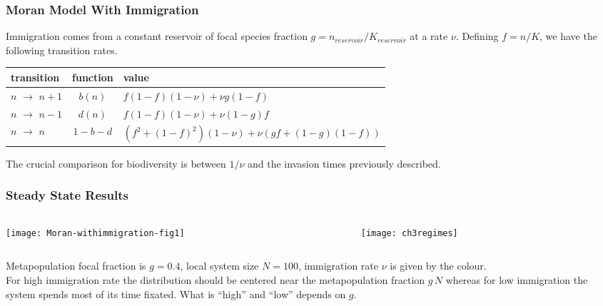 \documentclass[dvipsnames]{beamer}
\begin{document}
\begin{frame}
\frametitle{Moran Model With Immigration}
Immigration comes from a constant reservoir of focal species fraction $g=n_{reservoir}/K_{reservoir}$ at a rate $\nu$. 
Defining $f=n/K$, we have the following transition rates. 
\footnotesize{
\begin{center}
	\begin{tabular}{l|c|l}
		transition		& function	& value \\
		\hline
		$n$ $\rightarrow$ $n+1$	& $b(n)$	& $f(1-f)(1-\nu) + \nu g(1-f)$ \\
		$n$ $\rightarrow$ $n-1$	& $d(n)$	& $f(1-f)(1-\nu) + \nu (1-g)f$ \\
		$n$ $\rightarrow$ $n$	& $1-b-d$	& $\left(f^2+(1-f)^2\right)(1-\nu) + \nu\left(gf+(1-g)(1-f)\right)$
	\end{tabular}
\end{center}
}\normalsize{}
\pause
The crucial comparison for biodiversity is between $1/\nu$ and the invasion times previously described. 
\end{frame}


\begin{frame}
\frametitle{Steady State Results}
\begin{columns}
	\begin{column}{6cm}
		\begin{center}
			\texttt{[image: Moran-withimmigration-fig1]}
		\end{center}
	\end{column}
	\begin{column}{5cm}
		\begin{center}
			\texttt{[image: ch3regimes]}
		\end{center}
	\end{column}
\end{columns}
\justifying
\footnotesize{
Metapopulation focal fraction is $g=0.4$, local system size $N=100$, immigration rate $\nu$ is given by the colour. \\
For high immigration rate the distribution should be centered near the metapopulation fraction $g\,N$ whereas for low immigration the system spends most of its time fixated. 
What is ``high'' and ``low'' depends on $g$. 
}
\end{frame}
\end{document}

